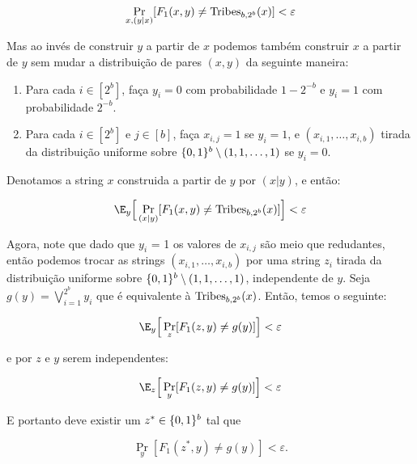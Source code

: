 \begin{equation*}
	\Pr_{x, (y \lvert x)}[F_{1}(x, y) \neq \text{Tribes}_{b, 2^{b}}(x)] < \varepsilon
\end{equation*}

Mas ao invés de construir $y$ a partir de $x$ podemos também construir $x$ a partir de $y$ sem mudar a distribuição de pares $(x, y)$ da seguinte maneira:

\begin{enumerate}

	\item Para cada $i \in [2^{b}]$, faça $y_{i} = 0$ com probabilidade $1 - 2^{-b}$ e $y_{i} = 1$ com probabilidade $2^{-b}$.
	
	\item Para cada $i \in [2^{b}]$ e $j \in [b]$, faça $x_{i, j} = 1$ se $y_{i} = 1$, e $(x_{i, 1}, \dots, x_{i, b})$ tirada da distribuição uniforme sobre $\{0, 1\}^{b} \setminus (1, 1, \dots, 1)$ se $y_{i} = 0$. 

\end{enumerate}

Denotamos a string $x$ construida a partir de $y$ por $(x \lvert y)$, e então:

\begin{equation*}
	\E_{y}\Big[\Pr_{(x \lvert y)}[F_{1}(x, y) \neq \Tribes_{b, 2^{b}}(x)]\Big] < \varepsilon
\end{equation*}

Agora, note que dado que $y_{i}$ = 1 os valores de $x_{i, j}$ são meio que redudantes, então podemos trocar as strings $(x_{i, 1}, \dots, x_{i, b})$ por uma string $z_{i}$ tirada da distribuição uniforme sobre $\{0, 1\}^{b} \setminus (1, 1, \dots, 1)$, independente de $y$. Seja $g(y) = \bigvee_{i = 1}^{2^{b}}y_{i}$ que é equivalente à $\text{Tribes}_{b, 2^{b}}(x)$. Então, temos o seguinte:

\begin{equation*}
	\E_{y}\Big[ \Pr_{z}[F_{1}(z, y) \neq g(y)]\Big] < \varepsilon
\end{equation*}

e por $z$ e $y$ serem independentes:

\begin{equation*}
	\E_{z}\Big[\Pr_{y}[F_{1}(z, y) \neq g(y)]\Big] < \varepsilon
\end{equation*}

E portanto deve existir um $z^{*} \in \{0, 1\}^{b}$ tal que

\begin{equation*}
	\Pr_{y}[F_{1}(z^{*}, y) \neq g(y)] < \varepsilon.
\end{equation*}

